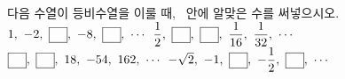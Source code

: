 다음 수열이 등비수열을 이룰 때, \blank\ 안에 알맞은 수를 써넣으시오.
 $1,\ -2,\ \blank,\ -8,\ \blank,\ \cdots$
 $\dfrac{1}{2},\ \blank,\ \blank,\ \dfrac{1}{16},\ \dfrac{1}{32},\ \cdots$
 $\blank,\ \blank,\ 18,\ -54,\ 162,\ \cdots$
 $-\sqrt{2},\ -1,\ \blank,\ -\dfrac{1}{2},\ \blank,\ \cdots$
